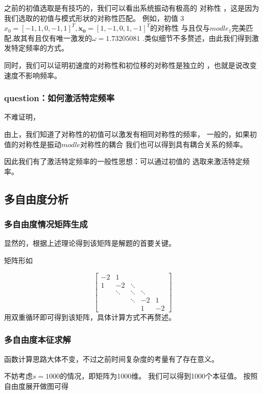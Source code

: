 \documentclass[11pt, a4paper, oneside]{ctexart}
\begin{document}
{{{之前的初值选取是有技巧的，我们可以看出系统振动有极高的
对称性
，这是因为我们选取的初值与模式形状的对称性匹配。
例如，初值 3${x_0}=[-1,1,0,-1,1]^T,
\boldsymbol{\dot x_0}=[1,-1,0,1,-1]^T
$的对称性
与且仅与$modle_1$完美匹配,故其有且仅有唯一激发的$\omega=1.73205081$
.类似细节不多赘述，由此我们得到激发特定频率的方式。

同时，我们可以证明初速度的对称性和初位移的对称性是独立的
，也就是说改变速度不影响频率。
\subsubsection{question：如何激活特定频率}

不难证明，

由上，我们知道了对称性的初值可以激发有相同对称性的频率，
一般的，如果初值的对称性是振动$modle$对称性的耦合
我们也可以得到具有耦合关系的频率。

因此我们有了激活特定频率的一般性思想：可以通过初值的
选取来激活特定频率。
\subsection{多自由度分析}
\subsubsection{多自由度情况矩阵生成}
显然的，根据上述理论得到该矩阵是解题的首要关键。

矩阵形如

$$
\left[\begin{array}{ccccc}
-2 & 1 &   & \\
1 & -2 & \ddots & & \\
& \ddots & \ddots  & \ddots & \\
&   & \ddots & -2 & 1 \\
&   & & 1 & -2
\end{array}\right]
$$
用双重循环即可得到该矩阵，具体计算方式不再赘述。

\subsubsection{多自由度本征求解}

函数计算思路大体不变，不过之前时间复杂度的考量有了存在意义。

不妨考虑$s=1000$的情况，即矩阵为1000维。
我们可以得到1000个本征值。
按照自由度展开做图可得
\begin{figure}[H]
        

\end{figure}}}}
\end{document}
